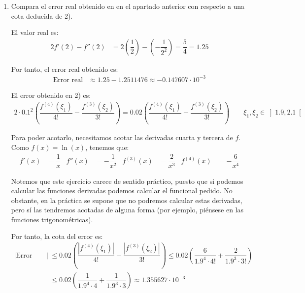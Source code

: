 \begin{ejercicio}
\begin{enumerate}
        \item Compara el error real obtenido en en el apartado anterior con respecto a una cota deducida de 2).
        
        El valor real es:
        \begin{align*}
            2f'(2) - f''(2) &= 2\left(\dfrac{1}{2}\right) - \left(-\dfrac{1}{2^2}\right) = \dfrac{5}{4} = 1.25
        \end{align*}

        Por tanto, el error real obtenido es:
        \begin{align*}
            \text{Error real} &\approx 1.25 - 1.2511476 \approx -0.147607\cdot 10^{-3}
        \end{align*}

        El error obtenido en 2) es:
        \begin{align*}
            2\cdot 0.1^2\left(\dfrac{f^{(4)}(\xi_1)}{4!}-\dfrac{f^{(3)}(\xi_2)}{3!}\right)=0.02\left(\dfrac{f^{(4)}(\xi_1)}{4!}-\dfrac{f^{(3)}(\xi_2)}{3!}\right)\qquad \xi_1,\xi_2\in\left]1.9,2.1\right[
        \end{align*}
        
        Para poder acotarlo, necesitamos acotar las derivadas cuarta y tercera de $f$. Como $f(x)=\ln(x)$, tenemos que:
        \begin{align*}
            f'(x) &= \dfrac{1}{x} &
            f''(x) &= -\dfrac{1}{x^2} &
            f^{(3)}(x) &= \dfrac{2}{x^3} &
            f^{(4)}(x) &= -\dfrac{6}{x^4}
        \end{align*}
        \begin{observacion}
            Notemos que este ejercicio carece de sentido práctico, puesto que si podemos calcular las funciones derivadas podemos calcular el funcional pedido. No obstante, en la práctica se supone que no podremos calcular estas derivadas, pero sí las tendremos acotadas de alguna forma (por ejemplo, piénsese en las funciones trigonométricas).
        \end{observacion}

        Por tanto, la cota del error es:
        \begin{align*}
            \left|\text{Error Predicho}\right|
            &\leq 0.02\left(\dfrac{|f^{(4)}(\xi_1)|}{4!}+\dfrac{|f^{(3)}(\xi_2)|}{3!}\right)\leq 0.02\left(\dfrac{6}{1.9^4\cdot 4!}+\dfrac{2}{1.9^3\cdot 3!}\right)\\
            &\leq 0.02\left(\dfrac{1}{1.9^4\cdot 4}+\dfrac{1}{1.9^3\cdot 3}\right)\approx 1.355627\cdot 10^{-3}
        \end{align*}
        

\end{enumerate}
\end{ejercicio}
